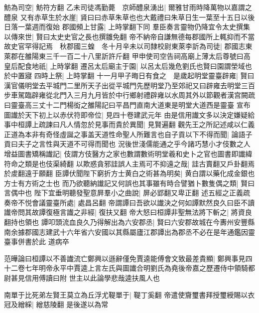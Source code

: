 魴為司空|{
	魴符方翻}
乙未司徒馮勤薨　京師醴泉湧出|{
	爾雅甘雨時降萬物以嘉謂之醴泉}
又有赤草生於水崖|{
	䝨曰曰赤草朱草也也大戴禮曰朱草日生一葉至十五日以後日落一葉週而復始}
郡國頻上甘露|{
	上時掌翻下同}
羣臣奏言靈物仍降宜令太史撰集以傳來世|{
	賢曰太史史官之長也撰雛免翻}
帝不納帝自謙無德每郡國所上輒抑而不當故史官罕得記焉　秋郡國三蝗　冬十月辛未以司隸校尉東萊李訢為司徒|{
	郡國志東萊郡在雒陽東三千一百二十八里訢許斤翻}
甲申使司空告祠高廟上薄太后尊號曰高皇后配食地祇|{
	上時掌翻}
遷呂太后廟主于園|{
	以呂太后幾危劉氏也賢曰園謂塋域也於中置寢}
四時上祭|{
	上時掌翻}
十一月甲子晦日有食之　是歲起明堂靈臺辟雍|{
	賢曰漢官儀明堂去平城門二里所天子出從平城門先歷明堂乃至郊祀又曰辟雍去明堂三百步車駕臨辟雍從北門入三月九月皆於中行鄉射禮辟雍以水周其外以節觀者漢宫闕疏曰靈臺高三丈十二門楊衒之雒陽記曰平昌門直南大道東是明堂大道西是靈臺}
宣布圖䜟於天下初上以赤伏符即帝位|{
	見四十卷建武元年}
由是信用䜟文多以決定嫌疑給事中桓譚上疏諫曰凡人情忽於見事而貴於異聞|{
	見賢遍翻}
觀先王之所記述咸以仁義正道為本非有奇怪虛誕之事盖天道性命聖人所難言也自子貢以下不得而聞|{
	論語子貢曰夫子之言性與天道不可得而聞也}
況後世淺儒能通之乎今諸巧慧小才伎數之人增益圖書矯稱䜟記|{
	伎謂方伎醫方之家也數謂數術明堂羲和史卜之官也圖書即䜟緯符命之類是也伎渠綺翻}
以欺惑貪邪詿誤人主焉可不抑遠之哉|{
	詿古賣翻又戶卦翻焉於䖍翻遠于願翻}
臣譚伏聞陛下窮折方士黄白之術甚為明矣|{
	黄白謂以藥化成金銀也方士有方術之士也}
而乃欲聽納䜟記又何誤也其事雖有時合譬猶卜數隻偶之類|{
	賢曰言偶中也}
陛下宜垂明聽發聖意屛羣小之曲說|{
	屏必郢翻又卑正翻}
述五經之正義疏奏帝不悦會議靈臺所處|{
	處昌呂翻}
帝謂譚曰吾欲以䜟決之何如譚默然良久曰臣不讀䜟帝問其故譚復極言䜟之非經|{
	復扶又翻}
帝大怒曰桓譚非聖無法將下斬之|{
	將資良翻持也領也}
譚叩頭流血良久乃得解出為六安郡丞|{
	賢曰六安郡故城在今夀州安豐縣南余據郡國志建武十六年省六安國以其縣屬廬江郡譚出為郡丞不必在是年通鑑因靈臺事併書於此}
道病卒

范曄論曰桓譚以不善䜟流亡鄭興以遜辭僅免賈逵能傅會文致最差貴顯|{
	鄭興事見四十二卷七年明帝永平中賈逵上言左氏與圖䜟合明劉氏為堯後帝嘉之歷遷侍中領騎都尉甚見信用傅讀曰附}
世主以此論學悲哉逵扶風人也

南單于比死弟左賢王莫立為丘浮尤鞮單于|{
	鞮丁奚翻}
帝遣使齎璽書拜授璽綬賜以衣冠及繒綵|{
	繒慈陵翻}
是後遂以為常

